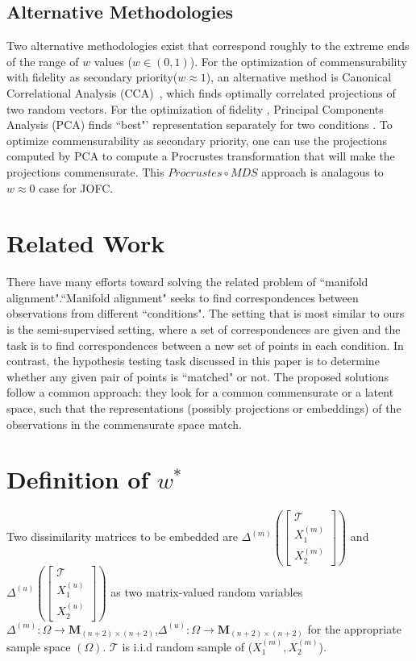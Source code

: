 \documentclass[11pt]{article} %
\begin{document}
\subsection{Alternative Methodologies}

Two alternative methodologies exist that correspond roughly to the extreme ends of the range of $w$ values ($w \in (0,1)$).
For the optimization of commensurability with fidelity as  secondary priority($w\approx 1$), an alternative method is Canonical Correlational Analysis (CCA)~\cite{Hardoon2004}, which finds optimally correlated projections of two random vectors. For the optimization of fidelity ,  Principal Components Analysis (PCA) finds ``best"' representation separately for two conditions . To optimize commensurability as  secondary priority, one can use the projections computed by PCA to  compute a Procrustes transformation that will make the projections commensurate. This $Procrustes \circ MDS$ approach is  analagous to $w\approx 0$ case for JOFC. 

\section{Related Work \label{sec:RelatedWork}}
There have many efforts toward solving the related problem of ``manifold alignment".``Manifold alignment" seeks to find correspondences between observations from different ``conditions". The setting that is most similar to ours is the semi-supervised setting\cite{Ham}, where a set of correspondences are given and the task is to find correspondences between a new set of points in each condition. In contrast, the hypothesis testing task discussed in this paper is to determine whether any given pair of points is ``matched" or not. The proposed solutions follow a common approach: they look for a common commensurate or a latent space, such that the representations (possibly projections or embeddings) of the observations in the commensurate space match.\cite{Wang2008,Zhai2010,3wayNMDS}


\section{Definition of  $w^{*}$}
Two dissimilarity matrices to be embedded are  $\Delta^{(m)} \left(\left[
\begin{array}{c}
\mathcal{T} \\
X_{1}^{(m)} \\
X_{2}^{(m)} 
\end {array}
\right]
\right)$  and 
 $\Delta^{(u)} \left(\left[
\begin{array}{c}
\mathcal{T}\\
X_{1}^{(u)} \\
X_{2}^{(u)}
\end {array}
\right]\right)$ as two matrix-valued random variables $\Delta^{(m)}:\Omega \rightarrow \mathbf{M}_{(n+2)\times (n+2)} $,$\Delta^{(u)}:\Omega \rightarrow \mathbf{M}_{(n+2)\times (n+2)} $  for the appropriate sample  space $(\Omega)$. $\mathcal{T}$ is i.i.d random sample of ($X_{1}^{(m)},X_{2}^{(m)}$).
\end{document}
